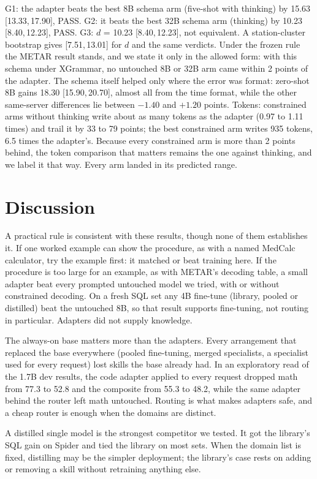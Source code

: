 \documentclass[11pt]{article}
\newcommand{\ci}[2]{[#1,\allowbreak\,#2]}
\begin{document}
G1: the adapter beats the best 8B schema arm (five-shot with thinking) by 15.63 \ci{13.33}{17.90}, PASS. G2: it beats
the best 32B schema arm (thinking) by 10.23 \ci{8.40}{12.23}, PASS. G3: $d$ = 10.23 \ci{8.40}{12.23}, not
equivalent. A station-cluster bootstrap gives \ci{7.51}{13.01} for $d$ and the same verdicts. Under the frozen rule
the METAR result stands, and we state it only in the allowed form: with this schema under XGrammar, no untouched 8B
or 32B arm came within 2 points of the adapter. The schema itself helped only where the error was format: zero-shot
8B gains 18.30 \ci{15.90}{20.70}, almost all from the time format, while the other same-server differences lie
between $-1.40$ and $+1.20$ points. Tokens: constrained arms without thinking write about as many tokens as the
adapter (0.97 to 1.11 times) and trail it by 33 to 79 points; the best constrained arm writes 935 tokens, 6.5 times
the adapter's. Because every constrained arm is more than 2 points behind, the token comparison that matters remains
the one against thinking, and we label it that way. Every arm landed in its predicted range.

\section{Discussion}

A practical rule is consistent with these results, though none of them establishes it. If one worked example can
show the procedure, as with a named MedCalc calculator, try the example first: it matched or beat training here. If
the procedure is too large for an example, as with METAR's decoding table, a small adapter beat every prompted
untouched model we tried, with or without constrained decoding. On a fresh SQL set any 4B fine-tune (library,
pooled or distilled) beat the untouched 8B, so that result supports fine-tuning, not routing in particular. Adapters
did not supply knowledge.

The always-on base matters more than the adapters. Every arrangement that replaced the base everywhere (pooled
fine-tuning, merged specialists, a specialist used for every request) lost skills the base already had. In an
exploratory read of the 1.7B dev results, the code adapter applied to every request dropped math from 77.3 to 52.8
and the composite from 55.3 to 48.2, while the same adapter behind the router left math untouched. Routing is what
makes adapters safe, and a cheap router is enough when the domains are distinct.

A distilled single model is the strongest competitor we tested. It got the library's SQL gain on Spider and tied the
library on most sets. When the domain list is fixed, distilling may be the simpler deployment; the library's case
rests on adding or removing a skill without retraining anything else.
\end{document}
